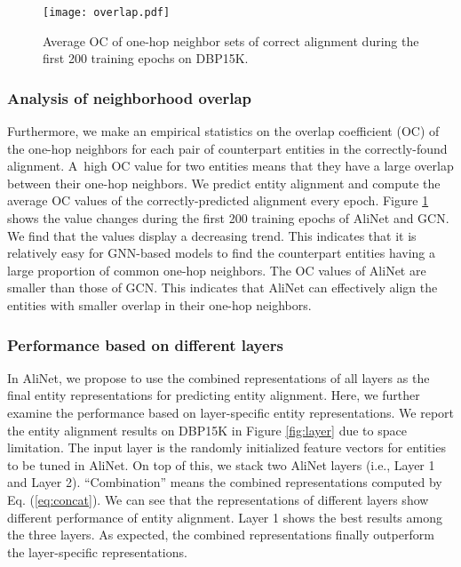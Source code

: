 \documentclass[letterpaper]{article} \usepackage{aaai20}  \usepackage{times}  \usepackage{helvet} \usepackage{courier}  \usepackage[hyphens]{url}  \usepackage{graphicx} \urlstyle{rm} \def\UrlFont{\rm}  \frenchspacing  \setlength{\pdfpagewidth}{8.5in}  \setlength{\pdfpageheight}{11in}  \usepackage{amsmath}
\begin{document}
\begin{figure}[!t]
	\center
	\texttt{[image: overlap.pdf]}
	\caption{Average OC of one-hop neighbor sets of correct alignment during the first 200 training epochs on DBP15K.}
	\label{fig:overlap}
\end{figure}

\subsubsection{Analysis of neighborhood overlap} Furthermore, we make an empirical statistics on the overlap coefficient (OC) of the one-hop neighbors for each pair of counterpart entities in the correctly-found alignment. A~high OC value for two entities means that they have a large overlap between their one-hop neighbors. We predict entity alignment and compute the average OC values of the correctly-predicted alignment every epoch. Figure \ref{fig:overlap} shows the value changes during the first 200 training epochs of AliNet and GCN. We find that the values display a decreasing trend. This indicates that it is relatively easy for GNN-based models to find the counterpart entities having a large proportion of common one-hop neighbors. The OC values of AliNet are smaller than those of GCN. This indicates that AliNet can effectively align the entities with smaller overlap in their one-hop neighbors. 

\subsubsection{Performance based on different layers} In AliNet, we propose to use the combined representations of all layers as the final entity representations for predicting entity alignment. Here, we further examine the performance based on layer-specific entity representations. We report the entity alignment results on DBP15K in Figure \ref{fig:layer} due to space limitation. The input layer is the randomly initialized feature vectors for entities to be tuned in AliNet. On top of this, we stack two AliNet layers (i.e., Layer 1 and Layer 2). ``Combination'' means the combined representations computed by Eq. (\ref{eq:concat}). We can see that the representations of different layers show different performance of entity alignment. Layer 1 shows the best results among the three layers. As expected, the combined representations finally outperform the layer-specific representations. 
\end{document}
